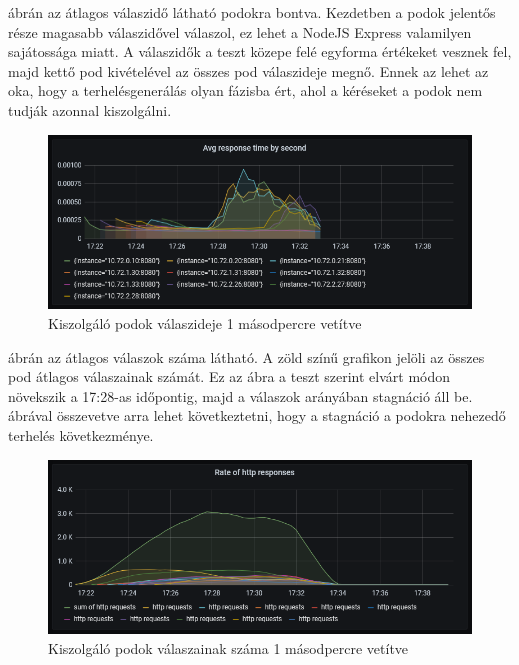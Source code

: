 \documentclass[a4paper,oneside]{article}
\begin{document}
 ábrán az átlagos válaszidő látható podokra
bontva.  Kezdetben a podok jelentős része magasabb válaszidővel válaszol, ez
lehet a NodeJS Express valamilyen sajátossága miatt.  A válaszidők a teszt
közepe felé egyforma értékeket vesznek fel, majd kettő pod kivételével az összes
pod válaszideje megnő.  Ennek az lehet az oka, hogy a terhelésgenerálás olyan
fázisba ért, ahol a kéréseket a podok nem tudják azonnal kiszolgálni.

\begin{figure}[H]
  \centering
  \includegraphics[width=\textwidth]{light_cpu_response_time.PNG}
  \caption{Kiszolgáló podok válaszideje 1 másodpercre vetítve}
  \label{light_cpu_response_time}  
\end{figure}

 ábrán az átlagos válaszok száma látható.  A zöld
színű grafikon jelöli az összes pod átlagos válaszainak számát.  Ez az ábra a
teszt szerint elvárt módon növekszik a 17:28-as időpontig, majd a válaszok
arányában stagnáció áll be.   ábrával összevetve
arra lehet következtetni, hogy a stagnáció a podokra nehezedő terhelés
következménye.

\begin{figure}[H]
  \centering
  \includegraphics[width=\textwidth]{light_cpu_response_count.PNG}
  \caption{Kiszolgáló podok válaszainak száma 1 másodpercre vetítve}
  \label{light_cpu_response_count}  
\end{figure}
\end{document}
